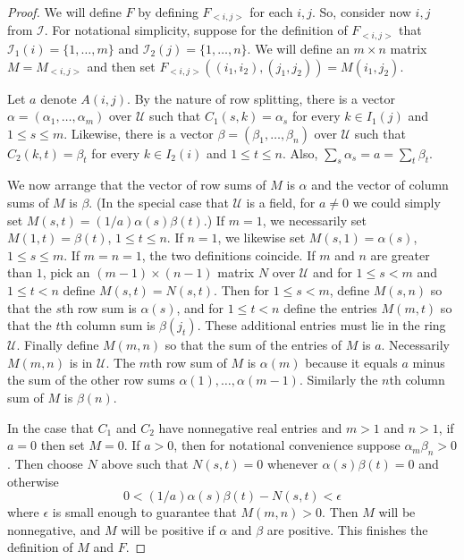 \documentclass{amsart}
\theoremstyle{definition}
\theoremstyle{remark}
\numberwithin{equation}{section}
\begin{document}
{\begin{proof}
We will define $F$ by defining 
$F_{<i,j>}$ for each $i,j$. 
So, consider now $i,j$ from $\mathcal I$.
For notational simplicity, suppose 
for the definition of $F_{<i,j>}$ that 
$\mathcal I_1(i)=\{1,\dots ,m\}$ and 
$\mathcal I_2(j)=\{1,\dots ,n\}$.
We will define an $m\times n$ matrix $M=M_{<i,j>}$ 
and then set 
$F_{<i,j>}((i_1,i_2),(j_1,j_2))= M(i_1,j_2)$. 

Let $a$ denote $A(i,j)$.   By the nature of row splitting, 
there is a vector $\alpha=(\alpha_1, \dots ,\alpha_m)$ over 
$\mathcal U$ such that $C_1(s,k)=\alpha_s$ for every $k\in 
I_1(j)$ and $1\leq s \leq m$. Likewise, 
there is a vector $\beta=(\beta_1, \dots ,\beta_n)$ over 
$\mathcal U$ such that $C_2(k,t)=\beta_t$ for every $k\in 
I_2(i)$  and $1\leq t \leq n$. Also, 
$\sum_s \alpha_s = a = \sum_t\beta_t$. 

We now arrange that the vector of row sums of $M$ is $\alpha$ and the vector of 
column sums of $M$ is $\beta$. 
(In the special case that $\mathcal U$ is a field, for 
$a\neq 0$ we could simply set 
$M(s,t)=(1/a) \alpha (s) \beta (t)$.) 
If $m=1$, we necessarily set $M(1,t)= \beta(t)$, $1\leq t \leq n$.  
If $n=1$, we likewise set  $M(s,1)= \alpha(s)$, $1\leq s \leq m$. 
If $m=n=1$, the two definitions coincide. 
If $m$ and $n$ are greater than $1$, 
pick an $(m-1)\times (n-1)$ matrix $N$ over $\mathcal U$
and for $1\leq s<m$ and $1\leq t <n$ define 
$M(s,t) =N(s,t)$. Then for $1\leq s < m$, 
define $M(s,n)$ so that the $s$th row sum is 
$\alpha (s)$, and 
for $1\leq t < n$ 
define the entries $M(m,t)$ so that the $t$th column sum is 
$\beta (j_t)$. These additional entries must lie in 
the ring $\mathcal U$. 
 Finally define  $M(m,n)$ so that the sum of 
the entries of $M$ is $a$. Necessarily $M(m,n)$ is in $\mathcal U$. 
The $m$th row sum of $M$ is $\alpha(m)$ because it equals 
$a$ minus the sum of the other row sums $\alpha(1), \dots , 
\alpha(m-1)$. Similarly the $n$th column sum of $M$ is $\beta(n)$. 

In the case that $C_1$ and $C_2$ have nonnegative real entries and 
$m> 1$ and $n>1$, if $a=0$ then set $M=0$. 
If $a>0$, then for 
notational convenience suppose $\alpha_m\beta_n >0$. 
Then choose $N$ above such that 
$N(s,t) =0$ whenever $\alpha(s)\beta(t)=0$ and otherwise 
\[
0 <  (1/a) \alpha(s)\beta(t)-N(s,t) < \epsilon 
\]
where $\epsilon $ is small enough to guarantee that 
$M(m,n)>0$. Then $M$ will be nonnegative, and $M$ will be positive 
if $\alpha$ and $\beta$ are positive. 
This finishes the definition of $M$ and $F$. 


\end{proof}}
\end{document}
